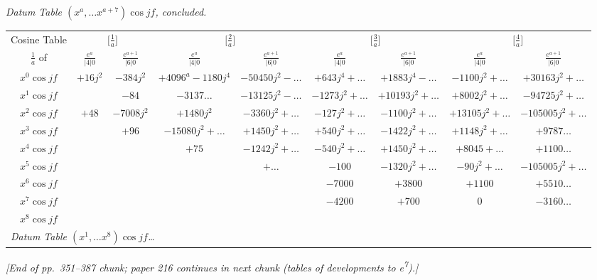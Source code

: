 \documentclass[12pt,a4paper]{article}
\theoremstyle{plain}
\begin{document}
\newpage
{}

\begin{center}
\textit{Datum Table $(x^{a},\ldots x^{a+7})\cos jf$, concluded.}
\smallskip

\small
\begin{tabular}{|c|c c|c c|c c|c c|}
\hline
Cosine Table & \multicolumn{2}{c|}{$\bigl[\frac{1}{a}\bigr]$} & \multicolumn{2}{c|}{$\bigl[\frac{2}{a}\bigr]$} & \multicolumn{2}{c|}{$\bigl[\frac{3}{a}\bigr]$} & \multicolumn{2}{c|}{$\bigl[\frac{4}{a}\bigr]$} \\
$\frac{1}{a}$ of \quad & $\frac{e^{a}}{|4|0}$ & $\frac{e^{a+1}}{|6|0}$ & $\frac{e^{a}}{|4|0}$ & $\frac{e^{a+1}}{|6|0}$ & $\frac{e^{a}}{|4|0}$ & $\frac{e^{a+1}}{|6|0}$ & $\frac{e^{a}}{|4|0}$ & $\frac{e^{a+1}}{|6|0}$ \\
\hline
$x^{0}\cos jf$ & $+16j^{2}$ & $-384j^{2}$    & $+4096^{a}-1180j^{4}$ & $-50450j^{2}-\ldots$ & $+643j^{4}+\ldots$ & $+1883j^{4}-\ldots$ & $-1100j^{2}+\ldots$ & $+30163j^{2}+\ldots$ \\
$x^{1}\cos jf$ &            & $-84$            & $-3137\ldots$ & $-13125j^{2}-\ldots$ & $-1273j^{2}+\ldots$ & $+10193j^{2}+\ldots$ & $+8002j^{2}+\ldots$ & $-94725j^{2}+\ldots$ \\
$x^{2}\cos jf$ & $+48$      & $-7008j^{2}$    & $+1480j^{2}$ & $-3360j^{2}+\ldots$ & $-127j^{2}+\ldots$ & $-1100j^{2}+\ldots$ & $+13105j^{2}+\ldots$ & $-105005j^{2}+\ldots$ \\
$x^{3}\cos jf$ &            & $+96$            & $-15080j^{2}+\ldots$ & $+1450j^{2}+\ldots$ & $+540j^{2}+\ldots$ &   $-1422j^{2}+\ldots$ & $+1148j^{2}+\ldots$ & $+9787\ldots$ \\
$x^{4}\cos jf$ &            &                  & $+75$           & $-1242j^{2}+\ldots$ & $-540j^{2}+\ldots$ & $+1450j^{2}+\ldots$ & $+8045+\ldots$ & $+1100\ldots$ \\
$x^{5}\cos jf$ &            &                  &                 & $+\ldots$            & $-100$           & $-1320j^{2}+\ldots$ & $-90j^{2}+\ldots$ & $-105005j^{2}+\ldots$ \\
$x^{6}\cos jf$ &            &                  &                 &                       & $-7000$          & $+3800$            & $+1100$        & $+5510\ldots$ \\
$x^{7}\cos jf$ &            &                  &                 &                       & $-4200$          & $+700$             & $0$            & $-3160\ldots$ \\
$x^{8}\cos jf$ &            &                  &                 &                       &                  &                    &                & \\
\hline
\multicolumn{9}{|l|}{\textit{Datum Table $(x^{1},\ldots x^{8})\cos jf$\ldots}}\\
\hline
\end{tabular}
\end{center}

\bigskip

\noindent\textit{[End of pp.~351--387 chunk; paper 216 continues in next chunk (tables of developments to e\textsuperscript{7}).]}
\end{document}
